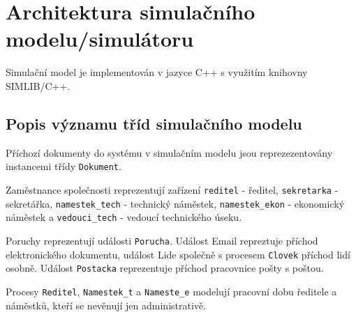 \documentclass[12pt,a4paper]{article}
\begin{document}



\newpage


\section{Architektura simulačního modelu/simulátoru}

Simulační model je implementován v jazyce C++ s využitím knihovny SIMLIB/C++.


\subsection{Popis významu tříd simulačního modelu}

Příchozí dokumenty do systému v simulačním modelu jsou reprezezentovány instancemi třídy {\tt Dokument}.

Zaměstnance společnosti reprezentují zařízení {\tt reditel} - ředitel, {\tt sekretarka} - sekretářka, {\tt namestek\_tech} - technický náměstek,
{\tt namestek\_ekon} - ekonomický náměstek a {\tt vedouci\_tech} - vedoucí technického úseku.

Poruchy reprezentují události {\tt Porucha}.
Událost Email repreztuje příchod elektronického dokumentu, událost Lide společně s procesem {\tt Clovek} příchod lidí osobně.
Událost {\tt Postacka} reprezentuje příchod pracovnice pošty s poštou.

Procesy {\tt Reditel}, {\tt Namestek\_t} a {\tt Nameste\_e} modelují pracovní dobu ředitele a náměstků, kteří se nevěnují jen administrativě.
\end{document}
